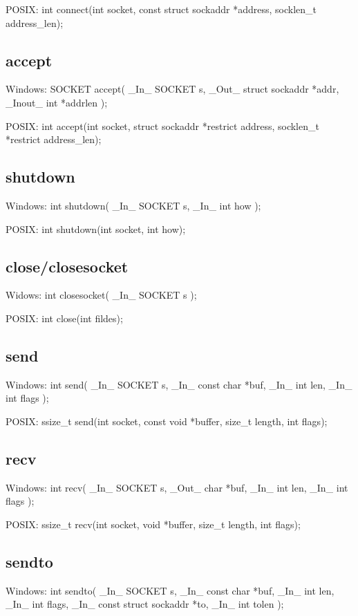 \documentclass[letterpaper,10pt]{article}
\begin{document}
POSIX:
int connect(int socket, const struct sockaddr *address,
       socklen\_t address\_len);

\subsection{accept}
Windows:
SOCKET accept(
  \_In\_     SOCKET s,
  \_Out\_    struct sockaddr *addr,
  \_Inout\_  int *addrlen
);

POSIX:
int accept(int socket, struct sockaddr *restrict address,
       socklen\_t *restrict address\_len);

\subsection{shutdown}
Windows:
int shutdown(
  \_In\_  SOCKET s,
  \_In\_  int how
);

POSIX:
int shutdown(int socket, int how);

\subsection{close/closesocket}
Widows:
int closesocket(
  \_In\_  SOCKET s
);

POSIX:
int close(int fildes);

\subsection{send}
Windows:
int send(
  \_In\_  SOCKET s,
  \_In\_  const char *buf,
  \_In\_  int len,
  \_In\_  int flags
);

POSIX:
ssize\_t send(int socket, const void *buffer, size\_t length, int flags);

\subsection{recv}
Windows:
int recv(
  \_In\_   SOCKET s,
  \_Out\_  char *buf,
  \_In\_   int len,
  \_In\_   int flags
);

POSIX:
ssize\_t recv(int socket, void *buffer, size\_t length, int flags);

\subsection{sendto}
Windows:
int sendto(
  \_In\_  SOCKET s,
  \_In\_  const char *buf,
  \_In\_  int len,
  \_In\_  int flags,
  \_In\_  const struct sockaddr *to,
  \_In\_  int tolen
);
\end{document}
